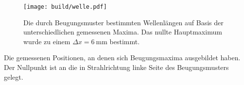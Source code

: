 




	



\begin{figure}
	\centering
	\texttt{[image: build/welle.pdf]}
	\caption{Die durch Beugungsmuster bestimmten Wellenlängen auf Basis der unterschiedlichen gemessenen Maxima. Das nullte Hauptmaximum wurde zu einem $\Delta x = \SI{6}{\milli\meter}$ bestimmt.}
	\label{fig:welle}
\end{figure}


\begin{table}
	\centering
	\caption{Die gemessenen Positionen, an denen sich Beugungsmaxima ausgebildet haben. Der Nullpunkt ist an die in Strahlrichtung linke Seite des Beugungsmusters gelegt.}
	
	\label{tab:tabwelle}
\end{table}
